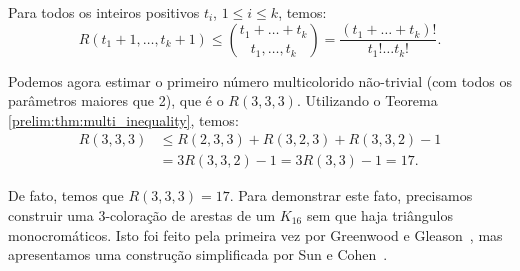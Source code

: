 \begin{corollary}
\label{prelim:thm:multinomial}
Para todos os inteiros positivos $t_i$, $1 \leq i \leq k$, temos:
\[ R(t_1 + 1, \dots, t_k + 1) \leq \binom{t_1 + \dots + t_k}{t_1, \dots, t_k} =  \frac{(t_1 + \dots + t_k)!}{t_1! \dots t_k!}. \]
\end{corollary}

Podemos agora estimar o primeiro número multicolorido não-trivial (com todos os parâmetros maiores que 2), que é o $R(3,3,3)$. Utilizando o Teorema \ref{prelim:thm:multi_inequality}, temos:
\begin{align*}
R(3,3,3) &\leq R(2,3,3) + R(3,2,3) + R(3,3,2) - 1 \\
&= 3R(3,3,2) - 1 = 3R(3,3) -1 = 17.
\end{align*}

De fato, temos que $R(3,3,3) = 17$. Para demonstrar este fato, precisamos construir uma 3-coloração de arestas de um $K_{16}$ sem que haja triângulos monocromáticos. Isto foi feito pela primeira vez por Greenwood e Gleason~\cite{greenwood}, mas apresentamos uma construção simplificada por Sun e Cohen~\cite{sun}.


